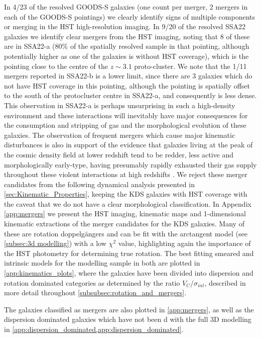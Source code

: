 \documentclass[fleqn,usenatbib]{mn2e}
\begin{document}
In 4/23 of the resolved GOODS-S galaxies (one count per merger, 2 mergers in each of the GOODS-S pointings) we clearly identify signs of multiple components or merging in the HST high-resolution imaging.
In 9/20 of the resolved SSA22 galaxies we identify clear mergers from the HST imaging, noting that 8 of these are in SSA22-a (80$\%$ of the spatially resolved sample in that pointing, although potentially higher as one of the galaxies is without HST coverage), which is the pointing close to the centre of the $z \sim 3.1$ proto-cluster.
We note that the 1/11 mergers reported in SSA22-b is a lower limit, since there are 3 galaxies which do not have HST coverage in this pointing, although the pointing is spatially offset to the south of the protocluster centre in SSA22-a, and consequently is less dense.
This observation in SSA22-a is perhaps unsurprising in such a high-density environment and these interactions will inevitably have major consequences for the consumption and stripping of gas and the morphological evolution of these galaxies.
The observation of frequent mergers which cause major kinematic disturbances is also in support of the evidence that galaxies living at the peak of the cosmic density field at lower redshift tend to be redder, less active and morphologically early-type, having presumably rapidly exhausted their gas supply throughout these violent interactions at high redshifts \citep[e.g.][]{Steidel1998,White2007,Kodama2007,Zheng2009}.  
We reject these merger candidates from the following dynamical analysis presented in \cref{sec:Kinematic_Properties}, keeping the KDS galaxies with HST coverage with the caveat that we do not have a clear morphological classification.
In Appendix \cref{app:mergers} we present the HST imaging, kinematic maps and 1-dimensional kinematic extractions of the merger candidates for the KDS galaxies.
Many of these are rotation doppelg{\"a}ngers and can be fit with the arctangent model (see \cref{subsec:3d modelling}) with a low $\chi ^{2}$ value, highlighting again the importance of the HST photometry for determining true rotation.
The best fitting smeared and intrinsic models for the modelling sample in both are plotted in \cref{app:kinematics_plots}, where the galaxies have been divided into dispersion and rotation dominated categories as determined by the ratio $V_{C}/\sigma_{int}$, described in more detail throughout \cref{subsubsec:rotation_and_mergers}.

The galaxies classified as mergers are also plotted in \cref{app:mergers}, as well as the dispersion dominated galaxies which have not been d with the full 3D modelling in \cref{app:dispersion_dominated,app:dispersion_dominated}.
\end{document}
